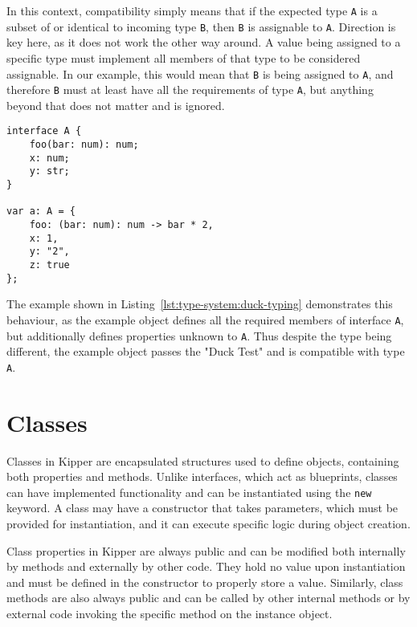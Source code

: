 In this context, compatibility simply means that if the expected type \lstinline|A| is a subset of or identical to incoming type \lstinline|B|, then \lstinline|B| is assignable to \lstinline|A|. Direction is key here, as it does not work the other way around. A value being assigned to a specific type must implement all members of that type to be considered assignable. In our example, this would mean that \lstinline|B| is being assigned to \lstinline|A|, and therefore \lstinline|B| must at least have all the requirements of type \lstinline|A|, but anything beyond that does not matter and is ignored.

\begin{lstlisting}[language=Kipper,caption=Demonstration of duck typing within Kipper,label=lst:type-system:duck-typing]
interface A {
	foo(bar: num): num;
	x: num;
	y: str;
}

var a: A = {
	foo: (bar: num): num -> bar * 2,
	x: 1,
	y: "2",
	z: true
};
\end{lstlisting}

The example shown in Listing~\ref{lst:type-system:duck-typing} demonstrates this behaviour, as the example object defines all the required members of interface \lstinline|A|, but additionally defines properties unknown to \lstinline|A|. Thus despite the type being different, the example object passes the "Duck Test" and is compatible with type \lstinline|A|.

\section{Classes}
\label{sec:kipper-classes}

Classes in Kipper are encapsulated structures used to define objects, containing both properties and methods. Unlike interfaces, which act as blueprints, classes can have implemented functionality and can be instantiated using the \lstinline|new| keyword. A class may have a constructor that takes parameters, which must be provided for instantiation, and it can execute specific logic during object creation.

Class properties in Kipper are always public and can be modified both internally by methods and externally by other code. They hold no value upon instantiation and must be defined in the constructor to properly store a value. Similarly, class methods are also always public and can be called by other internal methods or by external code invoking the specific method on the instance object.

